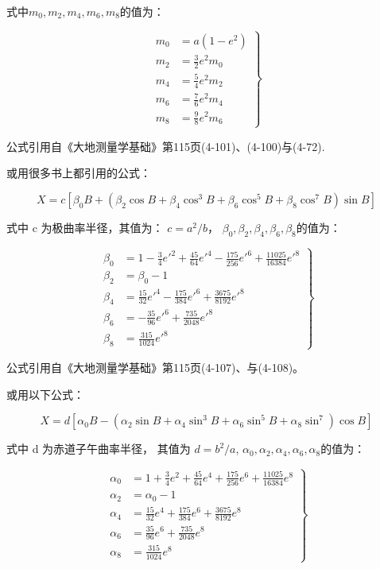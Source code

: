 \begin{enumerate}
式中$m_0, m_2, m_4, m_6, m_8$的值为：

\begin{equation}
\left . 
\begin{aligned}
m_0 &= a(1-e^2) \\
m_2 &= \frac{3}{2}e^2 m_0  \\
m_4 &= \frac{5}{4}e^2 m_2   \\
m_6 &= \frac{7}{6}e^2 m_4   \\
m_8 &= \frac{9}{8}e^2 m_6
\end{aligned} 
\right \}
\end{equation}

公式引用自《大地测量学基础》第115页(4-101)、(4-100)与(4-72).

或用很多书上都引用的公式：

\begin{equation}
X=c[\beta_0 B + (\beta_2 \cos B + \beta_4 \cos^3 B + \beta_6 \cos^5 B + \beta_8 \cos^7 B) \sin B] 
\end{equation}

式中 c 为极曲率半径，其值为： $c= a^2 / b$，
$\beta_0, \beta_2, \beta_4, \beta_6, \beta_8$的值为：

\begin{equation}
\left .
\begin{aligned}
\beta_0 &= 1 - \frac{3}{4}e'^2 + \frac{45}{64}e'^4 - \frac{175}{256}e'^6 + \frac{11025}{16384}e'^8  \\
\beta_2 &= \beta_0 -1  \\
\beta_4 &= \frac{15}{32}e'^4 - \frac{175}{384}e'^6 + \frac{3675}{8192}e'^8   \\
\beta_6 &= -\frac{35}{96}e'^6 + \frac{735}{2048}e'^8   \\
\beta_8 &= \frac{315}{1024}e'^8
\end{aligned} 
\right \}
\end{equation}

公式引用自《大地测量学基础》第115页(4-107)、与(4-108)。

或用以下公式：

\begin{equation}
X=d [\alpha_0 B  - ( \alpha_2 \sin B + \alpha_4 \sin ^3 B + \alpha_6 \sin ^5 B + \alpha_8 \sin^7 ) \cos B]
\end{equation}

式中 d 为赤道子午曲率半径， 其值为 $d=b^2 / a $, 
$\alpha_0, \alpha_2, \alpha_4, \alpha_6, \alpha_8$的值为：

\begin{equation}
\left .
\begin{aligned}
\alpha_0 &= 1+\frac{3}{4}e^2+\frac{45}{64}e^4+\frac{175}{256}e^6+\frac{11025}{16384}e^8  \\
\alpha_2 &= \alpha_0 - 1 \\
\alpha_4 &= \frac{15}{32}e^4+\frac{175}{384}e^6+\frac{3675}{8192}e^8 \\
\alpha_6 &= \frac{35}{96}e^6+\frac{735}{2048}e^8 \\
\alpha_8 &= \frac{315}{1024}e^8
\end{aligned} 
\right \}
\end{equation}


\end{enumerate}
